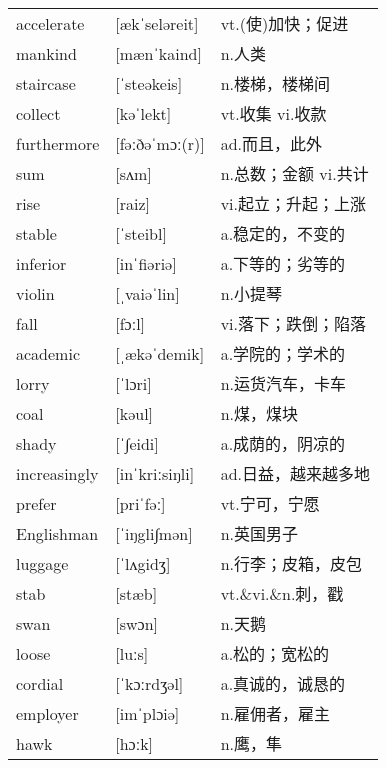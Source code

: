\documentclass[a4paper]{article}
\begin{document}
\section{}
\begin{tabular}{l l l}

accelerate & [ækˈseləreit] & vt.(使)加快；促进 \\
mankind & [mænˈkaind] & n.人类 \\
staircase & [ˈsteəkeis] & n.楼梯，楼梯间 \\
collect & [kəˈlekt] & vt.收集 vi.收款 \\
furthermore & [fəːðəˈmɔː(r)] & ad.而且，此外 \\
sum & [sʌm] & n.总数；金额 vi.共计 \\
rise & [raiz] & vi.起立；升起；上涨 \\
stable & [ˈsteibl] & a.稳定的，不变的 \\
inferior & [inˈfiəriə] & a.下等的；劣等的 \\
violin & [ˌvaiəˈlin] & n.小提琴 \\
fall & [fɔːl] & vi.落下；跌倒；陷落 \\
academic & [ˌækəˈdemik] & a.学院的；学术的 \\
lorry & [ˈlɔri] & n.运货汽车，卡车 \\
coal & [kəul] & n.煤，煤块 \\
shady & [ˈ∫eidi] & a.成荫的，阴凉的 \\
increasingly & [inˈkriːsiŋli] & ad.日益，越来越多地 \\
prefer & [priˈfəː] & vt.宁可，宁愿 \\
Englishman & [ˈiŋgli∫mən] & n.英国男子 \\
luggage & [ˈlʌgidʒ] & n.行李；皮箱，皮包 \\
stab & [stæb] & vt.\&vi.\&n.刺，戳 \\
swan & [swɔn] & n.天鹅 \\
loose & [luːs] & a.松的；宽松的 \\
cordial & [ˈkɔːrdʒəl] & a.真诚的，诚恳的 \\
employer & [imˈplɔiə] & n.雇佣者，雇主 \\
hawk & [hɔːk] & n.鹰，隼 \\

\end{tabular}
\end{document}

